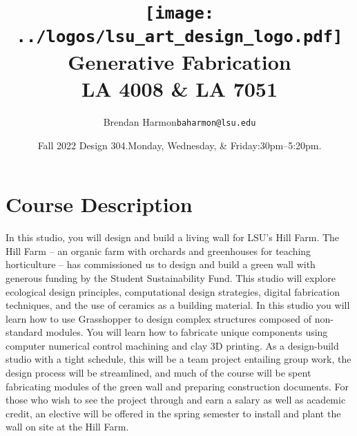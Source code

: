 \documentclass[11pt,article,oneside]{memoir}
\makeatletter
\def\myauthor{Author}
\def\mytitle{Title}
\def\myemail{baharmon@lsu.edu}
\def\myauthor{Brendan Harmon}
\def\mytitle{\texttt{[image: ../logos/lsu\_art\_design\_logo.pdf]}\\
[0.1cm]{\Large Generative Fabrication} \\ 
[-0.2cm]{\normalfont \normalsize LA 4008 \& LA 7051}}
\newcommand{\globalcolor}[1]{%
  \color{#1}\global\let\default@color\current@color
}
\makeatother
\begin{document}
\setlength\bibitemsep{0.5em}

\setmainfont{Lato-Regular}
\setmonofont[Mapping=tex-text,Scale=0.8]{Inconsolata}
\newfontfamily{}

\def\ind{\hangindent=1 true cm\hangafter=1 \noindent}
\def\labelitemi{$\cdot$}

\title{\LARGE \mytitle}
\author{\Large\myauthor \newline \footnotesize\texttt{\noindent\myemail}}
\date{Fall 2022 Design 304.\newline Monday, Wednesday, \& Friday:30pm--5:20pm.}
\published{\,}



\globalcolor{black}
\vspace*{-10em}
\maketitle

\section{Course Description}

In this studio, you will design and build
a living wall for LSU's Hill Farm.
The Hill Farm --
an organic farm with orchards and greenhouses
for teaching horticulture --
has commissioned us to design and build a green wall
with generous funding by the Student Sustainability Fund.
This studio will explore
ecological design principles,
computational design strategies,
digital fabrication techniques, and
the use of ceramics as a building material.
In this studio you will learn how to use Grasshopper
to design complex structures
composed of non-standard modules.
You will learn how to fabricate unique components
using computer numerical control machining
and clay 3D printing.
As a design-build studio with a tight schedule,
this will be a team project entailing group work,
the design process will be streamlined,
and much of the course will be spent
fabricating modules of the green wall
and preparing construction documents.
For those who wish to see the project through
and earn a salary as well as academic credit,
an elective will be offered in the spring semester
to install and plant the wall on site at the Hill Farm.
\\

\begin{center}
\end{center}
\end{document}
